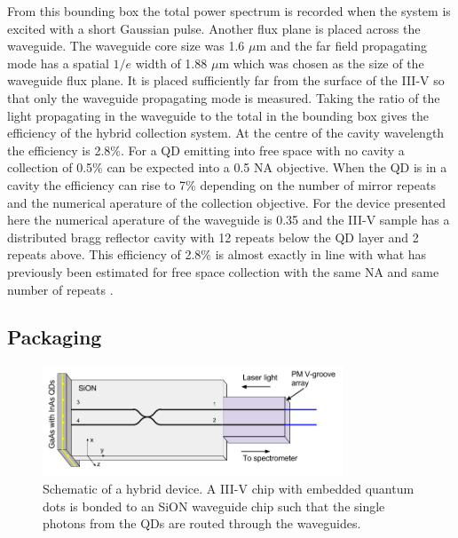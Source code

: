 From this bounding box the total power spectrum is recorded when the system is
excited with a short Gaussian pulse. Another flux plane is placed across the
waveguide. The waveguide core size was 1.6 $\mu \mathrm{m}$ and the far field
propagating mode has a spatial $1/e$ width of 1.88 $\mu \mathrm{m}$ which was
chosen as the size of the waveguide flux plane. It is placed sufficiently far
from the surface of the III-V so that only the waveguide propagating mode is
measured. Taking the ratio of the light propagating in the waveguide to the
total in the bounding box gives the efficiency of the hybrid collection system.
At the centre of the cavity wavelength the efficiency is 2.8\%. For a QD
emitting into free space with no cavity a collection of 0.5\% can be expected
into a 0.5 NA objective. When the QD is in a cavity the efficiency can rise to
7\% depending on the number of mirror repeats and the numerical aperature of the
collection objective. For the device presented here the numerical aperature of
the waveguide is 0.35 and the III-V sample has a distributed bragg reflector
cavity with 12 repeats below the QD layer and 2 repeats above. This efficiency
of 2.8\% is almost exactly in line with what has previously been estimated for
free space collection with the same NA and same number of repeats
\cite{bennett2006single}.

\subsection{Packaging}

\begin{figure}[h!] \begin{center}
\includegraphics[width=0.8\textwidth]{images/hyb_basic.png} \caption{Schematic
of a hybrid device. A III-V chip with embedded quantum dots is bonded to an SiON
waveguide chip such that the single photons from the QDs are routed through the
waveguides.} \label{fig:hyb_basic} \end{center} \end{figure}


